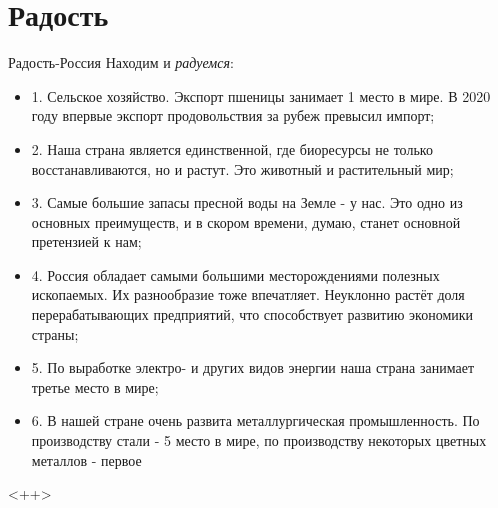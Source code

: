  
 
 
 
 
\chapter{Радость}

Радость-Россия
Находим и \emph{радуемся}:
\begin{itemize}
  \item 1. Сельское хозяйство. Экспорт пшеницы занимает 1 место в мире. В 2020 году впервые экспорт продовольствия за рубеж превысил импорт;
  \item 2. Наша страна является единственной, где биоресурсы не только восстанавливаются, но и растут. Это животный и растительный мир;
  \item 3. Самые большие запасы пресной воды на Земле - у нас. Это одно из основных преимуществ, и в скором времени, думаю, станет основной претензией к нам;
  \item 4. Россия обладает самыми большими месторождениями полезных ископаемых. Их разнообразие тоже впечатляет. Неуклонно растёт доля перерабатывающих предприятий, что способствует развитию экономики страны;
  \item 5. По выработке электро- и других видов энергии наша страна занимает третье место в мире;
  \item 6. В нашей стране очень развита металлургическая промышленность. По производству стали - 5 место в мире, по производству некоторых цветных металлов - первое
\end{itemize}
  <++>

